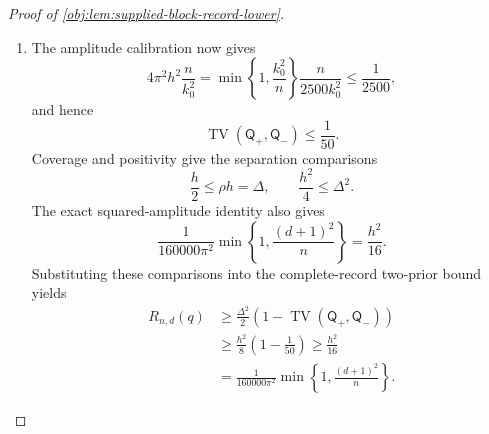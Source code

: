 \documentclass[11pt]{article}
\begin{document}
\begin{proof}[Proof of \cref{obj:lem:supplied-block-record-lower}]
\begin{enumerate}
The common-marginal identity in
\cref{obj:lem:baseline-translation-affinity} identifies
\(\mathcal E_{\mathrm{joint}}\) as the unhalved squared Hellinger distance between \(\mathsf J_+\) and \(\mathsf J_-\).
For completeness, the sharper total-variation comparison used here follows directly from Cauchy--Schwarz. Define the common reference measure by
\[
\mu_{\mathrm{cb}}(dz,dw,dy)=D(dz,dw)\,dy.
\]
Normalization and the definition of the energy imply
\[
\int
\left(
\sqrt{\lambda^{\mathrm{cb}}_{1,h}}
+
\sqrt{\lambda^{\mathrm{cb}}_{-1,h}}
\right)^2d\mu_{\mathrm{cb}}
=
4-\mathcal E_{\mathrm{joint}}.
\]
Consequently,
\[
\begin{aligned}
\operatorname{TV}(\mathsf J_+,\mathsf J_-)
&=
\frac12\int
\left|\lambda^{\mathrm{cb}}_{1,h}
-\lambda^{\mathrm{cb}}_{-1,h}\right|d\mu_{\mathrm{cb}}\\
&\le
\frac12
\sqrt{\mathcal E_{\mathrm{joint}}}
\sqrt{4-\mathcal E_{\mathrm{joint}}}\\
&=
\sqrt{\mathcal E_{\mathrm{joint}}
\left(1-\mathcal E_{\mathrm{joint}}/4\right)}
\le
\sqrt{\mathcal E_{\mathrm{joint}}}.
\end{aligned}
\]
The densities in these integrals are evaluated at \((y\mid z,w)\). Together with the recording-map bound, this proves
\[
\operatorname{TV}(\mathsf Q_+,\mathsf Q_-)
\le
\sqrt{4\pi^2h^2\frac{n}{k_0^2}}.
\]

\item The amplitude calibration now gives
\[
4\pi^2h^2\frac{n}{k_0^2}
=
\min\left\{1,\frac{k_0^2}{n}\right\}
\frac{n}{2500k_0^2}
\le\frac1{2500},
\]
and hence
\[
\operatorname{TV}(\mathsf Q_+,\mathsf Q_-)\le\frac1{50}.
\]
Coverage and positivity give the separation comparisons
\[
\frac h2\le\rho h=\Delta,
\qquad
\frac{h^2}{4}\le\Delta^2.
\]
The exact squared-amplitude identity also gives
\[
\frac{1}{160000\pi^2}
\min\left\{1,\frac{(d+1)^2}{n}\right\}
=\frac{h^2}{16}.
\]
Substituting these comparisons into the complete-record two-prior bound yields
\[
\begin{aligned}
R_{n,d}(q)
&\ge
\frac{\Delta^2}{2}
\left(1-\operatorname{TV}(\mathsf Q_+,\mathsf Q_-)\right)\\
&\ge
\frac{h^2}{8}\left(1-\frac1{50}\right)
\ge\frac{h^2}{16}\\
&=
\frac{1}{160000\pi^2}
\min\left\{1,\frac{(d+1)^2}{n}\right\}.
\end{aligned}
\]


\end{enumerate}
\end{proof}
\end{document}
